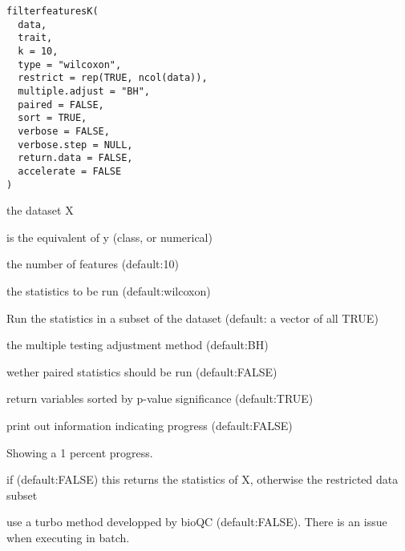 \documentclass[a4paper]{book}
\begin{document}
%
\begin{Usage}
\begin{verbatim}
filterfeaturesK(
  data,
  trait,
  k = 10,
  type = "wilcoxon",
  restrict = rep(TRUE, ncol(data)),
  multiple.adjust = "BH",
  paired = FALSE,
  sort = TRUE,
  verbose = FALSE,
  verbose.step = NULL,
  return.data = FALSE,
  accelerate = FALSE
)
\end{verbatim}
\end{Usage}
%
\begin{Arguments}
\begin{ldescription}
\item[\code{data:}] the dataset X

\item[\code{trait:}] is the equivalent of y (class, or numerical)

\item[\code{k:}] the number of features (default:10)

\item[\code{type:}] the statistics to be run (default:wilcoxon)

\item[\code{restrict:}] Run the statistics in a subset of the dataset (default: a vector of all TRUE)

\item[\code{multiple.adjust:}] the multiple testing adjustment method (default:BH)

\item[\code{paired:}] wether paired statistics should be run (default:FALSE)

\item[\code{sort:}] return variables sorted by p-value significance (default:TRUE)

\item[\code{verbose:}] print out information indicating progress (default:FALSE)

\item[\code{verbose.step:}] Showing a 1 percent progress.

\item[\code{return.data:}] if (default:FALSE) this returns the statistics of X, otherwise the restricted data subset

\item[\code{accelarate:}] use a turbo method developped by bioQC (default:FALSE). There is an issue when executing in batch.
\end{ldescription}
\end{Arguments}
\end{document}
